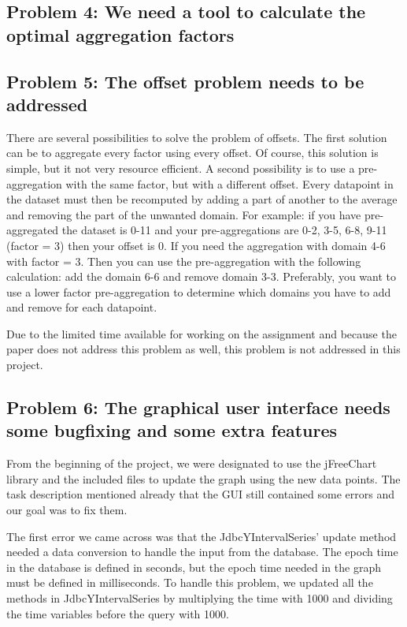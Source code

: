 \subsection{Problem 4: We need a tool to calculate the optimal aggregation factors}
\subsection{Problem 5: The offset problem needs to be addressed}
There are several possibilities to solve the problem of offsets. The first solution can be to aggregate every factor using every offset. Of course, this solution is simple, but it not very resource efficient. A second possibility is to use a pre-aggregation with the same factor, but with a different offset. Every datapoint in the dataset must then be recomputed by adding a part of another to the average and removing the part of the unwanted domain. For example: if you have pre-aggregated the dataset is 0-11 and your pre-aggregations are 0-2, 3-5, 6-8, 9-11 (factor = 3) then your offset is 0. If you need the aggregation with domain 4-6 with factor = 3. Then you can use the pre-aggregation with the following calculation: add the domain 6-6 and remove domain 3-3. Preferably, you want to use a lower factor pre-aggregation to determine which domains you have to add and remove for each datapoint.

Due to the limited time available for working on the assignment and because the paper\cite{wombacher2011} does not address this problem as well, this problem is not addressed in this project.

\subsection{Problem 6: The graphical user interface needs some bugfixing and some extra features}
From the beginning of the project, we were designated to use the jFreeChart library and the included files to update the graph using the new data points. The task description mentioned already that the GUI still contained some errors and our goal was to fix them.

The first error we came across was that the JdbcYIntervalSeries' update method needed a data conversion to handle the input from the database. The epoch time in the database is defined in seconds, but the epoch time needed in the graph must be defined in milliseconds. To handle this problem, we updated all the methods in JdbcYIntervalSeries by multiplying the time with 1000 and dividing the time variables before the query with 1000.

